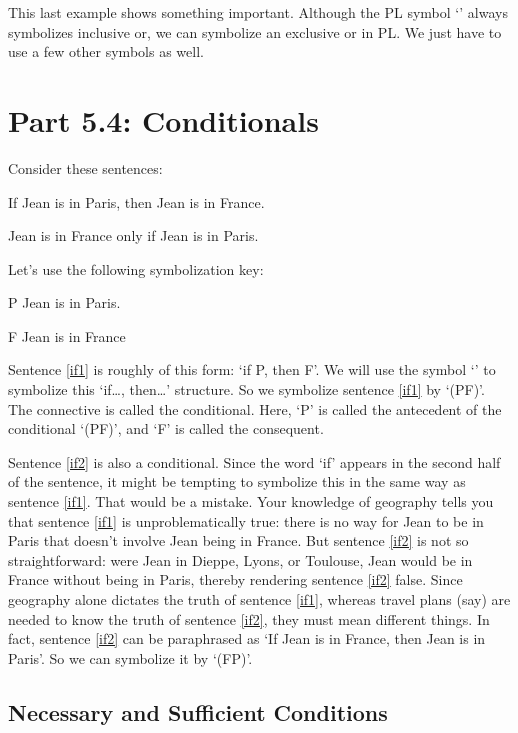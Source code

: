 This last example shows something important. Although the PL symbol ‘\eor’ always symbolizes inclusive or, we can symbolize an exclusive or in PL. We just have to use a few other symbols as well.
\section{Part 5.4: Conditionals} 
Consider these sentences:
	\begin{earg}
		\item[\ex{if1}] If Jean is in Paris, then Jean is in France.
		\item[\ex{if2}] Jean is in France only if Jean is in Paris.
	\end{earg}
Let's use the following symbolization key:
	\begin{ekey}
		\item[P] Jean is in Paris.
		\item[F] Jean is in France
	\end{ekey}
Sentence \ref{if1} is roughly of this form: ‘if P, then F’. We will use the symbol ‘\eif’ to symbolize this ‘if\ldots, then\ldots’ structure. So we symbolize sentence \ref{if1} by ‘(P\eif F)’. The connective is called the \gls{conditional}. Here, ‘P’ is called the \gls{antecedent} of the conditional ‘(P\eif F)’, and ‘F’ is called the \gls{consequent}.

Sentence \ref{if2} is also a conditional. Since the word ‘if’ appears in the second half of the sentence, it might be tempting to symbolize this in the same way as sentence \ref{if1}. That would be a mistake. Your knowledge of geography tells you that sentence \ref{if1} is unproblematically true: there is no way for Jean to be in Paris that doesn’t involve Jean being in France. But sentence \ref{if2} is not so straightforward: were Jean in Dieppe, Lyons, or Toulouse, Jean would be in France without being in Paris, thereby rendering sentence \ref{if2} false. Since geography alone dictates the truth of sentence \ref{if1}, whereas travel plans (say) are needed to know the truth of sentence \ref{if2}, they must mean different things.
In fact, sentence \ref{if2} can be paraphrased as ‘If Jean is in France, then Jean is in Paris’. So we can symbolize it by ‘(F\eif P)’.


\subsection{Necessary and Sufficient Conditions}

